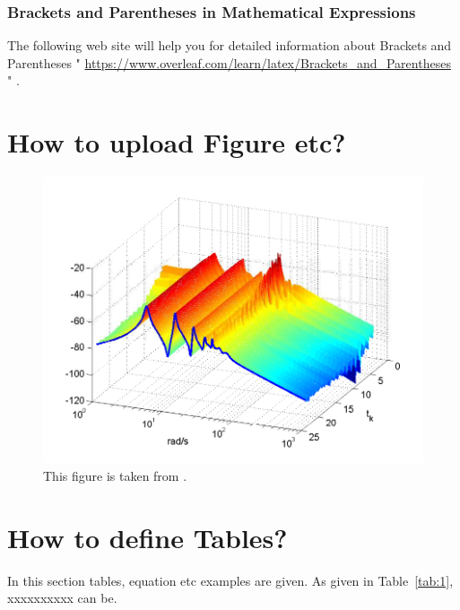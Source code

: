 \subsubsection{Brackets and Parentheses in Mathematical Expressions}
The following web site will help you for detailed information about Brackets and Parentheses " 
\url{https://www.overleaf.com/learn/latex/Brackets_and_Parentheses} " .




















\section{How to upload Figure etc?}


\begin{figure}
\centering
\includegraphics[width=0.8\columnwidth]{imgs/buildmagnitude.pdf}
\caption[Short description for list of figures]{This figure is taken from \cite{Sca:16}.}
\label{fig-magnitude}
\end{figure}%




\section{How to define Tables?}


In this section tables, equation etc examples are given. As given in Table~\ref{tab:1}, xxxxxxxxxx can be.

